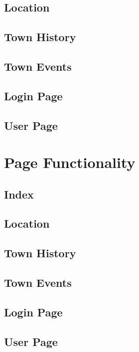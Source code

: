 \documentclass[12pt,a4paper]{article}
\begin{document}
		\subsection{Location}

		\subsection{Town History}

		\subsection{Town Events}

		\subsection{Login Page}

		\subsection{User Page}

	\clearpage

	\section{Page Functionality}
		\subsection{Index}

		\subsection{Location}

		\subsection{Town History}

		\subsection{Town Events}

		\subsection{Login Page}

		\subsection{User Page}
\end{document}
